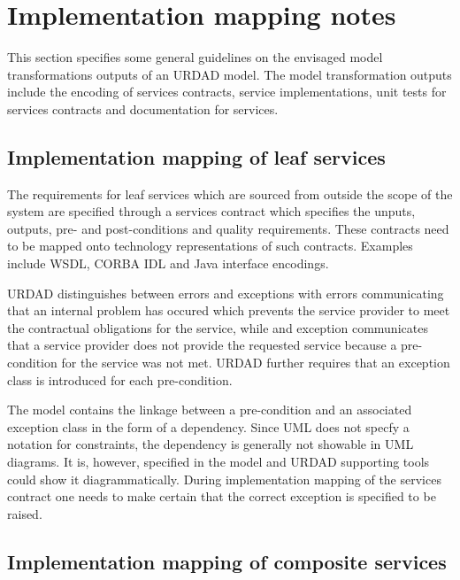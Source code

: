 \section{Implementation mapping notes}

This section specifies some general guidelines on the envisaged model transformations outputs of an URDAD model.
The model transformation outputs include the encoding of services contracts, service implementations, unit tests
for services contracts and documentation for services.


\subsection{Implementation mapping of leaf services}

The requirements for leaf services which are sourced from outside the scope of the system are specified 
through a services contract which specifies the unputs, outputs, pre- and post-conditions and quality requirements.
These contracts need to be mapped onto technology representations of such contracts. Examples include
WSDL, CORBA IDL and Java interface encodings.

URDAD distinguishes between errors and exceptions with errors communicating that an internal problem has occured 
which prevents the service provider to meet the contractual obligations for the service, while and exception communicates
that a service provider does not provide the requested service because a pre-condition for the service was not met.
URDAD further requires that an exception class is introduced for each pre-condition.

The model contains the linkage between a pre-condition and an associated exception class in the form of a dependency.
Since UML does not specfy a notation for constraints, the dependency is generally not showable in UML diagrams. 
It is, however, specified in the model and URDAD supporting tools could show it diagrammatically. During implementation
mapping of the services contract one needs to make certain that the correct exception is specified to be raised.


\subsection{Implementation mapping of composite services}


